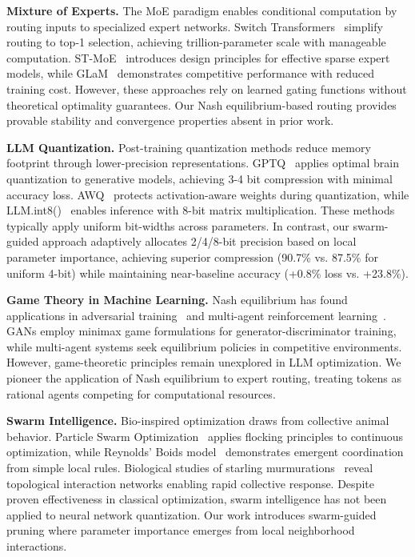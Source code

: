 \documentclass[11pt]{article}
\begin{document}
\textbf{Mixture of Experts.} The MoE paradigm enables conditional computation by routing inputs to specialized expert networks. Switch Transformers~\cite{fedus2021switch} simplify routing to top-1 selection, achieving trillion-parameter scale with manageable computation. ST-MoE~\cite{zoph2022designing} introduces design principles for effective sparse expert models, while GLaM~\cite{du2022glam} demonstrates competitive performance with reduced training cost. However, these approaches rely on learned gating functions without theoretical optimality guarantees. Our Nash equilibrium-based routing provides provable stability and convergence properties absent in prior work.

\textbf{LLM Quantization.} Post-training quantization methods reduce memory footprint through lower-precision representations. GPTQ~\cite{frantar2023gptq} applies optimal brain quantization to generative models, achieving 3-4 bit compression with minimal accuracy loss. AWQ~\cite{lin2023awq} protects activation-aware weights during quantization, while LLM.int8()~\cite{dettmers2022llm} enables inference with 8-bit matrix multiplication. These methods typically apply uniform bit-widths across parameters. In contrast, our swarm-guided approach adaptively allocates 2/4/8-bit precision based on local parameter importance, achieving superior compression (90.7\% vs. 87.5\% for uniform 4-bit) while maintaining near-baseline accuracy (+0.8\% loss vs. +23.8\%).

\textbf{Game Theory in Machine Learning.} Nash equilibrium has found applications in adversarial training~\cite{goodfellow2014generative} and multi-agent reinforcement learning~\cite{lowe2017multi}. GANs employ minimax game formulations for generator-discriminator training, while multi-agent systems seek equilibrium policies in competitive environments. However, game-theoretic principles remain unexplored in LLM optimization. We pioneer the application of Nash equilibrium to expert routing, treating tokens as rational agents competing for computational resources.

\textbf{Swarm Intelligence.} Bio-inspired optimization draws from collective animal behavior. Particle Swarm Optimization~\cite{kennedy1995particle} applies flocking principles to continuous optimization, while Reynolds' Boids model~\cite{reynolds1987flocks} demonstrates emergent coordination from simple local rules. Biological studies of starling murmurations~\cite{ballerini2008interaction} reveal topological interaction networks enabling rapid collective response. Despite proven effectiveness in classical optimization, swarm intelligence has not been applied to neural network quantization. Our work introduces swarm-guided pruning where parameter importance emerges from local neighborhood interactions.
\end{document}
